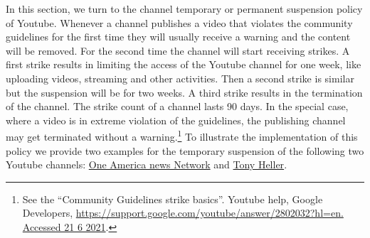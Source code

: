 \documentclass[11pt,a4paper]{article}
\begin{document}
In this section, we turn to the channel temporary or permanent suspension policy of Youtube. Whenever a channel publishes a video that violates the community guidelines for the first time they will  usually receive a warning and the content will be removed. For the second time the channel will start receiving strikes. A first strike results in limiting the access of the Youtube channel  for one week, like uploading videos, streaming and other activities. Then a second strike is similar but the suspension will be for two weeks. A third strike results in the termination of the channel. The strike count of a channel lasts 90 days.  In the special case, where a video is in extreme violation of the guidelines, the publishing channel may get terminated without a warning.\footnote{See the ``Community Guidelines strike basics''. Youtube help, Google Developers,  \href{https://support.google.com/youtube/answer/2802032?hl=en. Accessed 21 6 2021}{https://support.google.com/youtube/answer/2802032?hl=en. Accessed 21 6 2021}.} To illustrate the implementation of this policy we provide two examples for the temporary suspension of the following two Youtube channels: \href{https://www.youtube.com/channel/UCNbIDJNNgaRrXOD7VllIMRQ}{One America news Network} and \href{https://www.youtube.com/user/TonyHeller1}{Tony Heller}.

\smallskip

\end{document}
